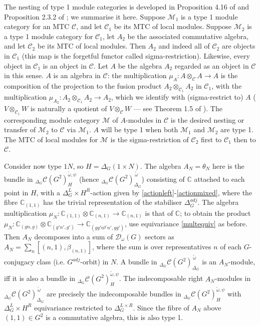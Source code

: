 \documentclass[12pt]{article}
\numberwithin{equation}{section}
\def\cC            {{\mathcal{C}}}
\def\cD            {{\mathcal{D}}}
\def\cM            {{\mathcal{M}}}
\def\bbC           {\mathbb{C}}
\begin{document}
The nesting of type 1 module categories is developed in Proposition 4.16  of
\cite{FFRS} and Proposition 2.3.2 of \cite{Dav}; we summarise it here. Suppose $\cM_1$
is a type 1 module category for an MTC $\cC$, and let $\cC_1$ be its MTC of local modules.
Suppose $\cM_2$
is a type 1 module category for $\cC_1$, let $A_2$ be the associated commutative algebra, and let $\cC_2$ be its MTC of local modules. Then $A_2$ and indeed all of $\cC_2$ are objects in $\cC_1$ (this map is the forgetful functor called sigma-restriction). Likewise, every object in $\cC_1$ is an object in
$\cC$. Let $A$ be the algebra $A_2$ regarded as an object in $\cC$ in this sense. $A$  is an algebra
in $\cC$: the multiplication $\mu_A:A\otimes_{\cC} A\rightarrow A$ is the composition of the projection to the fusion product $A_2\otimes_{\cC_1} A_2$ in $\cC_1$, with the multiplication
$\mu_{A_2}:A_2\otimes_{\cC_1} A_2\rightarrow A_2$, which we identify with (sigma-restrict to)  $A$ ($V\otimes_{\cC_1} W$ is naturally a quotient of
$V\otimes_{\cC} W$ --- see Theorem 1.5 of \cite{KO}). The corresponding module category $\cM$ of $A$-modules in $\cC$ is the desired nesting or transfer of $\cM_2$ to $\cC$ via $\cM_1$. $A$ will be type 1 when both $\cM_1$ and $\cM_2$ are type 1. The MTC of local modules for $\cM$ is the sigma-restriction of $\cC_2$ first to $\cC_1$ then to $\cC$.

Consider now type $1N$, so  $H=\Delta_G(1\times N)$. The algebra $A_N=\theta_N$ here is the  bundle in ${}_{\Delta_G}\cC(G^2)^{\tilde{\omega},\psi}_H$ (hence  ${}_{\Delta_G}\cC(G^2)^{\,\tilde{\omega}}_{\Delta_G}$) consisting of  $\bbC$ attached to each point in $H$, with a $\Delta_G^L\times H^R$-action given by \eqref{actionleft}-\eqref{actionmixed}, where the fibre $\bbC_{(1,1)}$ has the trivial representation of the stabiliser $\Delta_G^{adj}$. The algebra multiplication $\mu_N:\bbC_{(1,1)}\otimes\bbC_{(n,1)}\rightarrow \bbC_{(n,1)}$ is that of $\bbC$; to obtain the product
$\mu_N:\bbC_{(gn,g)}\otimes\bbC_{(g'n',g')}\rightarrow\bbC_{(gg'n^{g'}n',gg')}$, use equivariance \eqref{multequiv} as before.
Then $A_N$ decomposes into a sum of $\cD_\omega(G)$ sectors as
$A_N=\sum_n [(n,1),\beta_{(n,1)}]$, where the sum is over representatives $n$ of each $G$-conjugacy class (i.e. $G^{adj}$-orbit)
in $N$. A  bundle in ${}_{\Delta_G}\cC(G^2)^{\,\tilde{\omega}}_{\Delta_G}$ is an $A_N$-module, iff it is also a bundle in ${}_{\Delta_G}\cC(G^2)^{\tilde{\omega},\psi}_{H}$. The indecomposable right $A_N$-modules in ${}_{\Delta_G}\cC(G^2)_{\Delta_G}^{\,\tilde{\omega}}$ are precisely the indecomposable bundles in ${}_{\Delta_G}\cC(G^2)^{\tilde{\omega},\psi}_{H}$ with $\Delta_G^L\times H^R$ equivariance restricted to $\Delta_G^{L\times R}$. Since the fibre of $A_N$ above $(1,1)\in G^2$ is a commutative algebra, this is also type 1.
\end{document}

